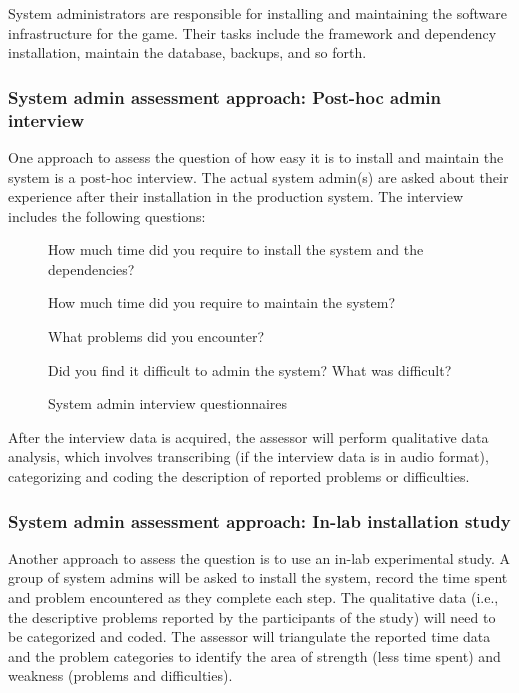 \documentclass[11pt,oneside]{book}
\begin{document}
System administrators are responsible for installing and maintaining the software infrastructure
for the game. Their tasks include the framework and dependency installation, maintain the database, backups, and so forth.

\subsubsection{System admin assessment approach: Post-hoc admin interview}
\label{Post-hoc system admin interview}

One approach to assess the question of how easy it is to install and maintain the system is a post-hoc interview. The actual system admin(s) are asked about their experience after their installation in the production system. The interview includes the following questions:\\

\begin{figure}[ht!]
\begin{mybox}
\begin{compactenum}
\item How much time did you require to install the system and the dependencies?
\item How much time did you require to maintain the system?
\item What problems did you encounter?
\item Did you find it difficult to admin the system? What was difficult?
\end{compactenum}
\end{mybox}
\caption{System admin interview questionnaires}
\label{fig:system-admin-interview}  
\end{figure}

After the interview data is acquired, the assessor will perform qualitative data
analysis, which involves transcribing (if the interview data is in audio format),
categorizing and coding the description of reported problems or difficulties.

\subsubsection{System admin assessment approach: In-lab installation study}
\label{In-lab installation study}

Another approach to assess the question is to use an in-lab experimental study. A group of system admins will 
be asked to install the system, record the time
spent and problem encountered as they complete each step. The qualitative data (i.e., the
descriptive problems reported by the participants of the study) will need to be categorized and
coded. The assessor will triangulate the reported time data and the problem categories to identify
the area of strength (less time spent) and weakness (problems and difficulties).
\end{document}
